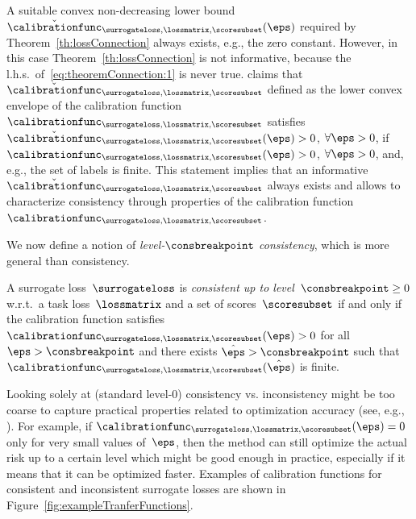 \documentclass{article}
\begin{document}
%
%

%

A suitable convex non-decreasing lower bound~$\check{\calibrationfunc}_{\surrogateloss,\lossmatrix,\scoresubset}(\eps)$ required by 
Theorem~\ref{th:lossConnection} always exists, e.g., the zero constant. However, in this case Theorem~\ref{th:lossConnection} is not informative, because the l.h.s.\ of~\eqref{eq:theoremConnection:1} is never true.
\citet[Proposition~25]{zhang04} claims that~$\check{\calibrationfunc}_{\surrogateloss,\lossmatrix,\scoresubset}$ defined as the lower convex envelope of the calibration function~$\calibrationfunc_{\surrogateloss,\lossmatrix,\scoresubset}$ satisfies $\check{\calibrationfunc}_{\surrogateloss,\lossmatrix,\scoresubset}(\eps) > 0$, $\forall \eps > 0$, if $\calibrationfunc_{\surrogateloss,\lossmatrix,\scoresubset}(\eps) > 0$, $\forall \eps > 0$, and, e.g., the set of labels is finite.
This statement implies that an informative $\check{\calibrationfunc}_{\surrogateloss,\lossmatrix,\scoresubset}$ always exists and allows to characterize consistency through properties of the calibration function~$\calibrationfunc_{\surrogateloss,\lossmatrix,\scoresubset}$.

%

%
%

We now define a notion of \emph{level-$\consbreakpoint$ consistency}, which is more general than consistency.
\begin{definition}
    \label{def:consistency}
    A surrogate loss~$\surrogateloss$ is \emph{consistent up to level~$\consbreakpoint \geq 0$} w.r.t.\ a task loss~$\lossmatrix$ and a set of scores~$\scoresubset$ if and only if the calibration function satisfies $\calibrationfunc_{\surrogateloss,\lossmatrix,\scoresubset}(\eps) > 0$ for all $\eps > \consbreakpoint$
    and there exists $\hat\eps > \consbreakpoint$ such that $\calibrationfunc_{\surrogateloss,\lossmatrix,\scoresubset}(\hat\eps)$ is finite.
\end{definition}
%
%
Looking solely at (standard level-$0$) consistency vs. inconsistency might be too coarse to capture practical properties related to optimization accuracy (see, e.g., \citep{long2013consistency}).
For example, if $\calibrationfunc_{\surrogateloss,\lossmatrix,\scoresubset}(\eps) = 0$ only for very small values of~$\eps$, then the method can still optimize the actual risk up to a certain level which might be good enough in practice, especially if it means that it can be optimized faster.
Examples of calibration functions for consistent and inconsistent surrogate losses are shown in Figure~\ref{fig:exampleTranferFunctions}.
\end{document}
